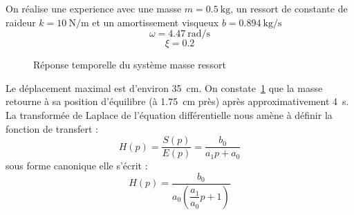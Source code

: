 On réalise une experience avec une masse $m=\SI{0.5}{\kilogram}$, un ressort 
de constante de raideur $k=\SI{10}{\newton\per\meter}$ et un amortissement 
visqueux $b=\SI{0.894}{\kilogram\per\second}$
\[
    \omega=\SI{4.47}{\radian\per\second}
\]
\[
    \xi=0.2
\]
\begin{figure}[!h]
    \centering
    
    \caption{Réponse temporelle du système masse ressort
    \label{fig-masse_ressort_reptemp}}
\end{figure}
Le déplacement maximal est d'environ \SI{35}{\centi\meter}. On 
constate~\cref{fig-masse_ressort_reptemp} que la masse retourne 
à sa position d'équilibre (à \SI{1.75}{\centi\meter} près) après 
approximativement \SI{4}{\second}.
\clearpage
La transformée de Laplace de l'équation différentielle nous amène à définir
la fonction de transfert :
\[
    H(p)= \dfrac{S(p)}{E(p)}=\dfrac{b_0}{a_1p+a_0}
\]
sous forme canonique elle s'écrit :
\[
    H(p)=\dfrac{b_0}{a_0\left(\dfrac{a_1}{a_0}p+1\right)}
\]
